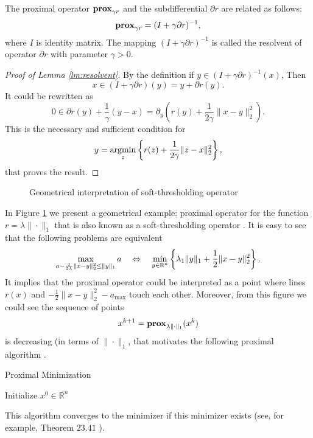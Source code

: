 {\begin{lemma}[Resolvent]\label{lm:resolvent}
    The proximal operator $\mathbf{prox}_{\gamma r}$ and the subdifferential $\partial r$ are related as follows:
    \begin{equation}\label{eq:resolvent}
        \mathbf{prox}_{\gamma r} = (I+\gamma\partial r)^{-1}, 
    \end{equation}
    where $I$ is identity matrix.
    The mapping $(I+\gamma\partial r)^{-1}$ is called the resolvent of operator $\partial r$ with parameter $\gamma>0$.
\end{lemma}
\begin{proof}[Proof of Lemma \ref{lm:resolvent}]
By the definition if $y\in (I+\gamma\partial r)^{-1}(x)$, Then
$$
x\in (I+\gamma\partial r)(y) = y + \partial r(y).
$$
It could be rewritten as
$$
0\in \partial r(y) + \frac{1}{\gamma}(y-x) = \partial_y \left(r(y) + \frac{1}{2\gamma}\|x-y\|_2^2\right).
$$
This is the necessary and sufficient condition for 
$$
y = \operatorname*{argmin}_z\left\{r(z) + \frac{1}{2\gamma}\|z-x\|_2^2\right\},
$$
that proves the result.
\end{proof}
}
\begin{figure}[H]
    \centering

    \caption{Geometrical interpretation of soft-thresholding operator}
    \label{fig:prox_l1}
\end{figure}

In Figure \ref{fig:prox_l1} we present a geometrical example: proximal operator for the function $r = \lambda\|\cdot\|_1$ that is also known as a soft-thresholding operator \cite{donoho1995noising}. It is easy to see that the following problems are equivalent 
$$
\max_{a - \frac{1}{2\lambda}\|x-y\|_2^2\leq\|y\|_1} a ~~~\Leftrightarrow~~~\min_{y\in\mathbb{R}^n}\left\{\lambda_1\|y\|_1 + \frac{1}{2}\|x-y\|_2^2\right\}.
$$
It implies that the proximal operator could be interpreted as a point where lines $r(x)$ and $-\frac{1}{2}\|x-y\|_2^2-a_{\max}$ touch each other. Moreover, from this figure we could see the sequence of points 
$$
x^{k+1} = \mathbf{prox}_{\lambda\|\cdot\|_1}(x^k)
$$
is decreasing (in terms of $\|\cdot\|_1$, that motivates the following proximal algorithm \cite{rockafellar1976monotone}.

\begin{algorithm}
    \caption{Proximal Minimization}
    \label{algo:pm}
    \begin{algorithmic}
        \STATE Initialize $x^0\in\mathbb{R}^n$
        \ENDFOR
    \end{algorithmic}
\end{algorithm}

This algorithm converges to the minimizer if this minimizer exists (see, for example, Theorem $23.41$ \cite{bauschke2011convex}).
